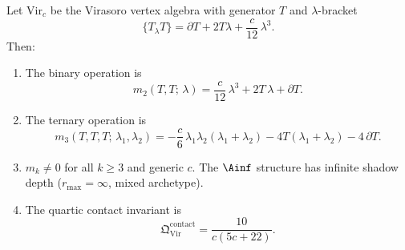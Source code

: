 \begin{theorem}
Let $\mathrm{Vir}_c$ be the Virasoro vertex algebra
with generator $T$ and $\lambda$-bracket
\begin{equation}%
\{T{}_\lambda T\}
= \partial T + 2T\lambda + \frac{c}{12}\,\lambda^3.
\end{equation}
Then:
\begin{enumerate}[label=\textup{(\roman*)}]
\item The binary operation is
\begin{equation}%
m_2(T, T;\, \lambda)
= \frac{c}{12}\,\lambda^3
+ 2T\,\lambda + \partial T.
\end{equation}

\item The ternary operation is
\begin{equation}%
m_3(T,T,T;\, \lambda_1, \lambda_2)
= -\frac{c}{6}\,\lambda_1\lambda_2(\lambda_1 + \lambda_2)
- 4T(\lambda_1 + \lambda_2)
- 4\,\partial T.
\end{equation}

\item $m_k \ne 0$ for all $k \ge 3$ and generic $c$.
The $\Ainf$ structure has infinite shadow depth
($r_{\max} = \infty$, mixed archetype).

\item The quartic contact invariant is
\begin{equation}%
\mathfrak{Q}^{\mathrm{contact}}_{\mathrm{Vir}}
= \frac{10}{c(5c+22)}.
\end{equation}
\end{enumerate}
\end{theorem}

